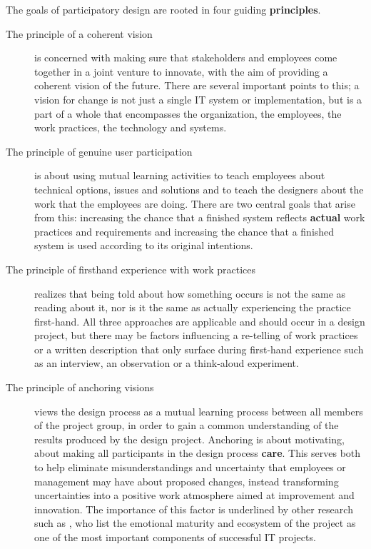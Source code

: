 The goals of participatory design are rooted in four guiding \textbf{principles}.
\begin{description}
    \item [The principle of a coherent vision] is concerned with making sure that stakeholders
        and employees come together in a joint venture to innovate, with the aim
        of providing a coherent vision of the future. There are several
        important points to this; a vision for change is not just a single IT
        system or implementation, but is a part of a whole that encompasses the
        organization, the employees, the work practices, the technology and
        systems. 
    \item [The principle of genuine user participation] is about using mutual learning activities
        to teach employees about technical options, issues and solutions and to
        teach the designers about the work that the employees are doing. There are
        two central goals that arise from this: increasing the chance that a
        finished system reflects \textbf{actual} work practices and
        requirements and increasing the chance that a finished system is used
        according to its original intentions.
    \item [The principle of firsthand experience with work practices] realizes that being told
        about how something occurs is not the same as reading about it, nor is
        it the same as actually experiencing the practice first-hand. All three
        approaches are applicable and should occur in a design project, but
        there may be factors influencing a re-telling of work practices or a
        written description that only surface during first-hand experience such
        as an interview, an observation or a think-aloud experiment.
    \item [The principle of anchoring visions] views the design process as a mutual learning
        process between all members of the project group, in order to gain a
        common understanding of the results produced by the design
        project\cite{bodker2004participatory}. Anchoring is about motivating,
        about making all participants in the design process \textbf{care}. This
        serves both to help eliminate misunderstandings and uncertainty
        that employees or management may have about proposed changes, instead
        transforming uncertainties into a positive work atmosphere aimed at
        improvement and innovation. The importance of this factor is underlined
        by other research such as \cite{standish20012}, who list the emotional
        maturity and ecosystem of the project as one of the most important
        components of successful IT projects.
\end{description}

